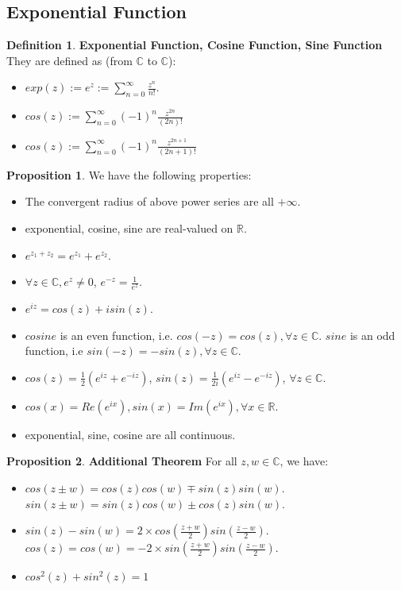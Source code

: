 \documentclass{article}
\theoremstyle{definition}
\newtheorem{defi}{Definition}[subsection]
\newtheorem{prop}{Proposition}[subsection]
\begin{document}
\subsection{Exponential Function}
\begin{defi}
\textbf{Exponential Function, Cosine Function, Sine Function} They are defined as (from $\mathbb{C}$ to $\mathbb{C}$):
\begin{itemize}
    \item $exp(z) := e^z := \sum_{n=0}^{\infty}\frac{z^n}{n!}$.
    \item $cos(z) := \sum_{n=0}^{\infty}(-1)^{n}\frac{z^{2n}}{(2n)!}$
    \item $cos(z) := \sum_{n=0}^{\infty}(-1)^{n}\frac{z^{2n+1}}{(2n+1)!}$
\end{itemize}
\end{defi}
\begin{prop}
We have the following properties:
\begin{itemize}
    \item The convergent radius of above power series are all $+\infty$.
    \item exponential, cosine, sine are real-valued on $\mathbb{R}$.
    \item $e^{z_1+z_2}=e^{z_1}+e^{z_2}$.
    \item $\forall z \in \mathbb{C}, e^z \neq 0$, $e^{-z}=\frac{1}{e^z}$.
    \item $e^{iz}=cos(z)+isin(z)$.
    \item $cosine$ is an even function, i.e. $cos(-z)=cos(z), \forall z\in\mathbb{C}$. $sine$ is an odd function, i.e $sin(-z)=-sin(z), \forall z\in\mathbb{C}$.
    \item $cos(z)=\frac{1}{2}(e^{iz}+e^{-iz})$, $sin(z)=\frac{1}{2i}(e^{iz}-e^{-iz})$, $\forall z\in\mathbb{C}$.
    \item $cos(x)=Re(e^{ix}), sin(x)=Im(e^{ix}), \forall x\in\mathbb{R}$.
    \item exponential, sine, cosine are all continuous.
\end{itemize}
\end{prop}
\begin{prop}
\textbf{Additional Theorem} For all $z,w\in\mathbb{C}$, we have:
\begin{itemize}
    \item $cos(z\pm w)=cos(z)cos(w)\mp sin(z)sin(w)$.
    $sin(z\pm w) = sin(z)cos(w)\pm cos(z)sin(w)$.
    \item $sin(z)-sin(w)=2\times cos(\frac{z+w}{2})sin(\frac{z-w}{2})$. $cos(z)=cos(w)=-2\times sin(\frac{z+w}{2})sin(\frac{z-w}{2})$.
    \item $cos^{2}(z)+sin^{2}(z)=1$
\end{itemize}
\end{prop}
\end{document}
